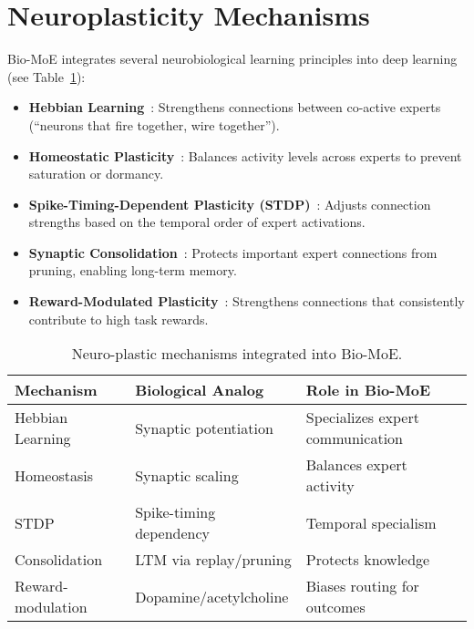 \documentclass[12pt]{article}
\begin{document}
\section{Neuroplasticity Mechanisms}
Bio-MoE integrates several neurobiological learning principles into deep learning (see Table~\ref{tab:mechanisms}):
\begin{itemize}
    \item \textbf{Hebbian Learning}~\citep{hebb1949organization,hebbian_guide}: Strengthens connections between co-active experts (``neurons that fire together, wire together'').
    \item \textbf{Homeostatic Plasticity}~\citep{turrigiano2012homeostatic,lu2023synaptic}: Balances activity levels across experts to prevent saturation or dormancy.
    \item  \textbf{Spike-Timing-Dependent Plasticity (STDP)}~\citep{sjostrom2010stdp,debanne2023stdp}: Adjusts connection strengths based on the temporal order of expert activations.
    \item \textbf{Synaptic Consolidation}~\citep{clopath2011synaptic,bhasin2024synaptic,lindsey2024consolidation}: Protects important expert connections from pruning, enabling long-term memory.
    \item \textbf{Reward-Modulated Plasticity}~\citep{legenstein2008reward,sorn2015reward}: Strengthens connections that consistently contribute to high task rewards.
\end{itemize}

\begin{table}[h]
\centering
\begin{tabular}{|l|l|l|}
\hline
Mechanism & Biological Analog & Role in Bio-MoE \\
\hline
Hebbian Learning & Synaptic potentiation & Specializes expert communication \\
Homeostasis & Synaptic scaling & Balances expert activity \\
STDP & Spike-timing dependency & Temporal specialism \\
Consolidation & LTM via replay/pruning & Protects knowledge \\
Reward-modulation & Dopamine/acetylcholine & Biases routing for outcomes \\
\hline
\end{tabular}
\caption{Neuro-plastic mechanisms integrated into Bio-MoE.}
\label{tab:mechanisms}
\end{table}
\end{document}

